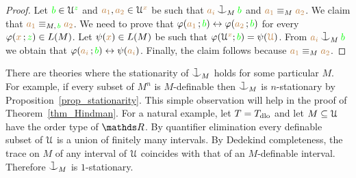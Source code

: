 \begin{proof}
Let ${\color{green} b}\in\EuScript U^{\color{green} z}$ and ${\color{brown} a_1},{\color{brown} a_2}\in\EuScript U^{\color{brown} x}$ be such that ${\mr a_i}\cnonfork_M{\gr b}$ and ${\color{brown} a_1}\equiv_M{\color{brown} a_2}$.
We claim that ${\color{brown} a_1}\equiv_{M,\,{\color{green} b}}{\color{brown} a_2}$.
We need to prove that $\varphi({\color{brown} a_1}\,;{\color{green} b})\leftrightarrow\varphi({\color{brown} a_2}\,;{\color{green} b})$ for every  $\varphi({\color{brown} x}\,;{\color{green} z})\in L(M)$.
Let $\psi({\color{brown} x})\in L(M)$ be such that $\varphi(\EuScript U^{\color{brown} x};{\color{green} b})=\psi({\color{brown} \EuScript U})$.
From ${\mr a_i}\cnonfork_M{\gr b}$ we obtain that  $\varphi({\color{brown} a_i}\,;{\color{green} b})\leftrightarrow\psi({\color{brown} a_i})$.
Finally, the claim follows because ${\color{brown} a_1}\equiv_M{\color{brown} a_2}$.
\end{proof}



% 


\begin{remark}\label{rk_coheir_stationary}
There are theories where the stationarity of $\cnonfork_M$ holds for some particular $M$.
For example, if every subset of $M^n$ is $M$-definable then $\cnonfork_M$ is $n$-stationary by Proposition~\ref{prop_stationarity}.
This simple observation will help in the proof of Theorem~\ref{thm_Hindman}.
For a natural example, let $T=T_{\rm dlo}$ and let $M\subseteq\EuScript U$ have the order type of $\RR$.
By quantifier elimination every definable subset of $\EuScript U$ is a union of finitely many intervals.
By Dedekind completeness, the trace on $M$ of any interval of $\EuScript U$ coincides with that of an $M$-definable interval.
Therefore $\cnonfork_M$ is $1$-stationary.
\end{remark}

